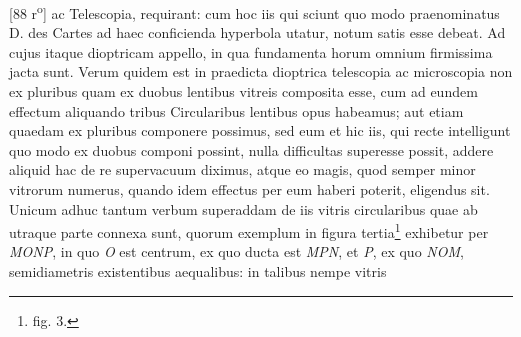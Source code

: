 [88 r\textsuperscript{o}] ac Telescopia\protect{}, requirant: cum hoc iis qui sciunt quo modo  praenominatus D. des Cartes\protect{} ad haec conficienda hyperbola  utatur, notum satis esse debeat. Ad cujus itaque dioptricam\protect{}  appello, in qua fundamenta horum omnium firmissima  jacta sunt. Verum quidem est in praedicta dioptrica\protect{} telescopia\protect{}  ac microscopia\protect{} non ex pluribus quam ex duobus lentibus\protect{}  vitreis composita esse, cum ad eundem effectum aliquando  tribus Circularibus lentibus\protect{} opus habeamus; aut etiam  quaedam ex pluribus componere possimus, sed eum et  hic iis, qui recte intelligunt quo modo ex duobus  componi possint, nulla difficultas superesse possit,  addere aliquid hac de re supervacuum diximus, atque  eo magis, quod semper minor vitrorum numerus, quando  idem effectus per eum haberi poterit, eligendus sit.  Unicum adhuc tantum verbum superaddam de iis vitris  circularibus quae ab utraque parte connexa sunt, quorum  exemplum in figura tertia\footnote{fig. 3.} exhibetur per \textit{MONP}, in quo \textit{O} est centrum, ex quo ducta est \textit{MPN}, et \textit{P}, ex quo \textit{NOM},  semidiametris existentibus aequalibus: in talibus nempe vitris 